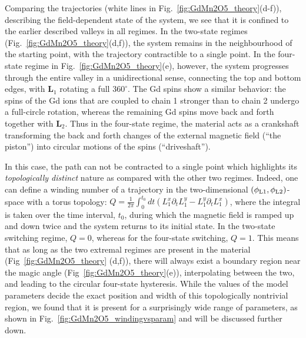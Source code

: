 Comparing the trajectories (white lines in Fig.~\ref{fig:GdMn2O5_theory}(d-f)), describing the field-dependent state of the system, we see that it is confined to the earlier described valleys in all regimes.
%
In the two-state regimes (Fig.~\ref{fig:GdMn2O5_theory}(d,f)), the system remains in the neighbourhood of the starting point, with the trajectory contractible to a single point. 
In the four-state regime in Fig.~\ref{fig:GdMn2O5_theory}(e), however, the system progresses through the entire valley in a unidirectional sense, connecting the top and bottom edges, with $\bm{L}_1$ rotating a full $360^\circ$.
The Gd spins show a similar behavior: the spins of the Gd ions that are coupled to chain 1 stronger than to chain 2 undergo a full-circle rotation, whereas the remaining Gd spins move back and forth together with $\bm{L}_2$.
Thus in the four-state regime, the material acts as a crankshaft transforming the back and forth changes of the external magnetic field (``the piston'') into circular motions of the spins (``driveshaft'').

In this case, the path can not be contracted to a single point which highlights its {\em  topologically distinct} nature as compared with the other two regimes.
Indeed, one can define a winding number of a trajectory in the two-dimensional  $(\phi_{\rm L1},\phi_{\rm L2})$-space with a torus topology: $Q=\frac{1}{2\pi}\int_0^{t_0} dt (L_1^x\partial_t L_1^y - L_1^y \partial_t L_1^x)$, 
where the integral is taken over the time interval, $t_0$, during which the magnetic field is ramped up and down twice and the system returns to its initial state.
In the two-state switching regime, $Q  = 0$, whereas for the four-state switching, $Q = 1$.
This means that as long as the two extremal regimes are present in the material (Fig~\ref{fig:GdMn2O5_theory} (d,f)), there will always exist a boundary region near the magic angle (Fig~\ref{fig:GdMn2O5_theory}(e)), interpolating between the two, and leading to the circular four-state hysteresis.
While the values of the model parameters decide the exact position and width of this topologically nontrivial region, we found that it is present for a surprisingly wide range of parameters, as shown in Fig.~\ref{fig:GdMn2O5_windingvsparam} and will be discussed further down.

